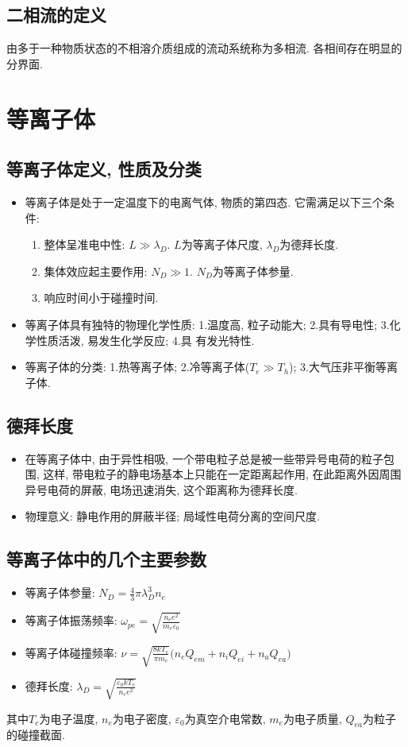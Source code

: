 \documentclass[a4paper,titlepage,twocolumn]{article}
\begin{document}
\subsection{二相流的定义}
由多于一种物质状态的不相溶介质组成的流动系统称为多相流. 各相间存在明显的分界面.

\section{等离子体}
\subsection{等离子体定义, 性质及分类}
\begin{itemize}
\item 等离子体是处于一定温度下的电离气体, 物质的第四态. 它需满足以下三个条件:
\begin{enumerate}
\item 整体呈准电中性: $L\gg \lambda_D$. $L$为等离子体尺度, $\lambda_D$为德拜长度.
\item 集体效应起主要作用: $N_D \gg 1$. $N_D$为等离子体参量.
\item 响应时间小于碰撞时间.
\end{enumerate}
\item 等离子体具有独特的物理化学性质: 1.温度高, 粒子动能大; 2.具有导电性; 3.化学性质活泼, 易发生化学反应; 4.具
有发光特性.
\item 等离子体的分类: 1.热等离子体; 2.冷等离子体($T_e\gg T_h$); 3.大气压非平衡等离子体.
\end{itemize}

\subsection{德拜长度}
\begin{itemize}
\item 在等离子体中, 由于异性相吸, 一个带电粒子总是被一些带异号电荷的粒子包围, 这样, 带电粒子的静电场基本上只能在一定距离起作用, 在此距离外因周围异号电荷的屏蔽, 电场迅速消失, 这个距离称为德拜长度.
\item 物理意义: 静电作用的屏蔽半径; 局域性电荷分离的空间尺度.
\end{itemize}


\subsection{等离子体中的几个主要参数}
\begin{itemize}
\item 等离子体参量: $\displaystyle N_D=\frac{4}{3}\pi\lambda_D^3n_e$
\item 等离子体振荡频率: $\displaystyle \omega_{pe}=\sqrt{\frac{n_e e^2}{m_e \varepsilon_0}}$
\item 等离子体碰撞频率: $\displaystyle \nu=\sqrt{\frac{8kT_e}{\pi m_e}}\big(n_eQ_{em}+n_iQ_{ei}+n_aQ_{ea}\big)$
\item 德拜长度: $\displaystyle \lambda_D=\sqrt{\frac{\varepsilon_0kT_e}{n_ee^2}}$
\end{itemize}
其中$T_e$为电子温度, $n_e$为电子密度, $\varepsilon_0$为真空介电常数, $m_e$为电子质量, $Q_{ea}$为粒子的碰撞截面.
\end{document}
